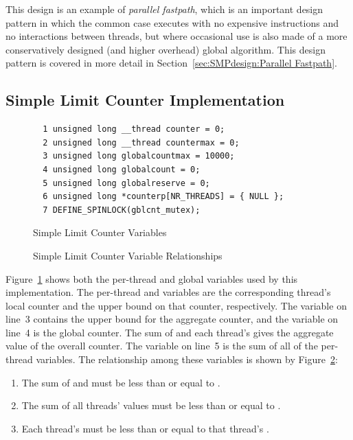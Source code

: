 This design is an example of \emph{parallel fastpath}, which is an important
design pattern in which the common case executes with no expensive
instructions and no interactions between threads, but where occasional
use is also made of a more conservatively designed
(and higher overhead) global algorithm.
This design pattern is covered in more detail in
Section~\ref{sec:SMPdesign:Parallel Fastpath}.

\subsection{Simple Limit Counter Implementation}
\label{sec:count:Simple Limit Counter Implementation}

\begin{figure}[tbp]
{ \scriptsize
\begin{verbatim}
  1 unsigned long __thread counter = 0;
  2 unsigned long __thread countermax = 0;
  3 unsigned long globalcountmax = 10000;
  4 unsigned long globalcount = 0;
  5 unsigned long globalreserve = 0;
  6 unsigned long *counterp[NR_THREADS] = { NULL };
  7 DEFINE_SPINLOCK(gblcnt_mutex);
\end{verbatim}
}
\caption{Simple Limit Counter Variables}
\label{fig:count:Simple Limit Counter Variables}
\end{figure}

\begin{figure}[tb]
\begin{center}
\end{center}
\caption{Simple Limit Counter Variable Relationships}
\label{fig:count:Simple Limit Counter Variable Relationships}
\end{figure}

Figure~\ref{fig:count:Simple Limit Counter Variables}
shows both the per-thread and global variables used by this
implementation.
The per-thread  and  variables are the
corresponding thread's local counter and the upper bound on that
counter, respectively.
The  variable on line~3 contains the upper
bound for the aggregate counter, and the  variable
on line~4 is the global counter.
The sum of  and each thread's  gives
the aggregate value of the overall counter.
The  variable on line~5 is the sum of all of the
per-thread  variables.
The relationship among these variables is shown by
Figure~\ref{fig:count:Simple Limit Counter Variable Relationships}:
\begin{enumerate}
\item	The sum of  and  must
	be less than or equal to .
\item	The sum of all threads'  values must be
	less than or equal to .
\item	Each thread's  must be less than or equal to
	that thread's .
\end{enumerate}

